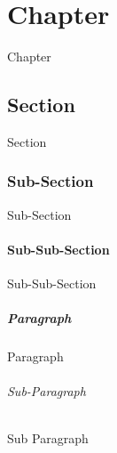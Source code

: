 \chapter{Chapter}\label{ch:example-chapter}
	Chapter

	\section{Section}\label{sec:example-section}
		Section

		\subsection{Sub-Section}\label{ssec:example-subsection}
			Sub-Section

			\subsubsection{Sub-Sub-Section}\label{sssec:example-subsubsection}
				Sub-Sub-Section

				\paragraph{Paragraph}\label{par:example-paragraph} 
					Paragraph

					\subparagraph{Sub-Paragraph}\label{spar:example-subparagraph} 
						Sub Paragraph
